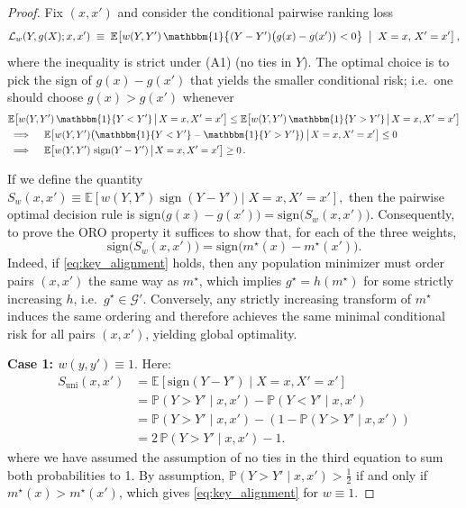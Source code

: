\documentclass[11pt]{article}
\theoremstyle{plain}
\theoremstyle{plain}
\theoremstyle{plain}
\theoremstyle{plain}
\theoremstyle{plain}
\theoremstyle{plain}
\theoremstyle{plain}
\begin{document}
\begin{proof}
Fix $(x,x')$ and consider the conditional pairwise ranking loss
\[
\mathcal{L}_w(Y, g(X); x,x')
\;\equiv\;
\mathbb{E}\!\left[
w(Y,Y')\,
\mathbbm{1}\!\left\{(Y-Y')\big(g(x)-g(x')\big)<0\right\}
\;\bigm|\; X=x,\,X'=x'
\right],
\]
where the inequality is strict under (A1) (no ties in $Y$). The optimal choice is to pick the sign of $g(x)-g(x')$
that yields the smaller conditional risk; i.e.\ one should choose $g(x)>g(x')$ whenever
\begin{align}
&\mathbb{E}\!\left[
w(Y,Y')\,\mathbbm{1}\{Y<Y'\}\,\big|\, X=x,X'=x'
\right]
\le
\mathbb{E}\!\left[
w(Y,Y')\,\mathbbm{1}\{Y>Y'\}\,\big|\, X=x,X'=x'
\right] \nonumber \\
&\implies\quad
\mathbb{E}\!\left[
w(Y,Y')\big(\mathbbm{1}\{Y<Y'\}-\mathbbm{1}\{Y>Y'\}\big)\,\big|\, X=x,X'=x'
\right]
\le 0 \nonumber \\
&\implies\quad
\mathbb{E}\!\left[
w(Y,Y')\,\operatorname{sign}(Y-Y')\,\big|\, X=x,X'=x'
\right]
\ge 0 \, . \nonumber
\end{align}

If we define the quantity $S_w(x,x')
\equiv
\mathbb{E}[
w(Y,Y')\operatorname{sign}(Y-Y')
|\; X=x,X'=x'
],$
then the pairwise optimal decision rule is $\mathrm{sign}\!\big(g(x)-g(x')\big)
=
\mathrm{sign}\!\big(S_w(x,x')\big)$.  Consequently, to prove the ORO property it suffices to show that, for each of the three weights,
\begin{equation}
\label{eq:key_alignment}
\mathrm{sign}\!\big(S_w(x,x')\big)
=
\mathrm{sign}\!\big(m^\star(x)-m^\star(x')\big) .
\end{equation}
Indeed, if \eqref{eq:key_alignment} holds, then any population minimizer must order
pairs $(x,x')$ the same way as $m^\star$, which implies $g^\star=h( m^\star)$ for some strictly
increasing $h$, i.e.\ $g^\star\in\mathcal{G}'$. Conversely, any strictly increasing transform of $m^\star$ induces the same ordering and therefore achieves the same minimal conditional risk for all pairs $(x,x')$,
yielding global optimality.

\smallskip
\noindent\textbf{Case 1: $w(y,y')\equiv 1$}.
Here:
\begin{align*}
    S_{\mathrm{uni}}(x,x') 
    &= \mathbb{E}\!\left[\mathrm{sign}(Y-Y')\mid X=x,X'=x'\right] \\
    &= \mathbb{P}(Y>Y'\mid x,x')-\mathbb{P}(Y<Y'\mid x,x')\\
    &= \mathbb{P}(Y>Y'\mid x,x')-(1-\mathbb{P}(Y>Y'\mid x,x'))\\
    &= 2\,\mathbb{P}(Y>Y'\mid x,x')-1.
\end{align*}
where we have assumed the assumption of no ties in the third equation to sum both probabilities to 1. By assumption, $\mathbb{P}(Y>Y'\mid x,x')>\tfrac12$ if and only if
$m^\star(x)>m^\star(x')$, which gives \eqref{eq:key_alignment} for $w\equiv 1$.


\end{proof}
\end{document}
